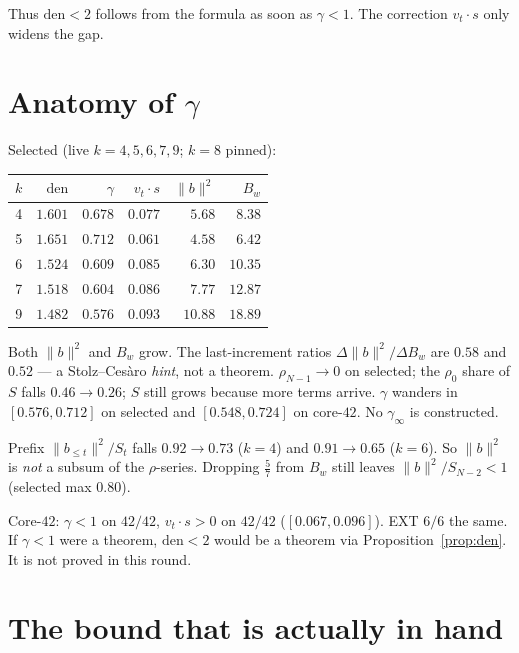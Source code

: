 \documentclass[11pt]{article}
\theoremstyle{remark}
\begin{document}
Thus $\mathrm{den}<2$ follows from the formula as
soon as $\gamma<1$.
The correction $v_t\cdot s$ only widens the gap.

\section{Anatomy of $\gamma$}\label{sec:gam}

Selected (live $k=4,5,6,7,9$; $k=8$ pinned):

\begin{center}
\begin{tabular}{rrrrrr}
\toprule
$k$ & $\mathrm{den}$ & $\gamma$ & $v_t\cdot s$ & $\|b\|^2$ & $B_w$ \\
\midrule
4 & $1.601$ & $0.678$ & $0.077$ & $5.68$ & $8.38$ \\
5 & $1.651$ & $0.712$ & $0.061$ & $4.58$ & $6.42$ \\
6 & $1.524$ & $0.609$ & $0.085$ & $6.30$ & $10.35$ \\
7 & $1.518$ & $0.604$ & $0.086$ & $7.77$ & $12.87$ \\
9 & $1.482$ & $0.576$ & $0.093$ & $10.88$ & $18.89$ \\
\bottomrule
\end{tabular}
\end{center}

Both $\|b\|^2$ and $B_w$ grow.
The last-increment ratios
$\Delta\|b\|^2/\Delta B_w$ are $0.58$ and $0.52$
--- a Stolz--Ces\`aro \emph{hint}, not a theorem.
$\rho_{N-1}\to 0$ on selected; the $\rho_0$ share of
$S$ falls $0.46\to 0.26$; $S$ still grows because
more terms arrive.
$\gamma$ wanders in $[0.576,0.712]$ on selected and
$[0.548,0.724]$ on core-$42$.
No $\gamma_\infty$ is constructed.

Prefix $\|b_{\le t}\|^2/S_t$ falls
$0.92\to 0.73$ ($k=4$) and $0.91\to 0.65$ ($k=6$).
So $\|b\|^2$ is \emph{not} a subsum of the
$\rho$-series.
Dropping $\tfrac57$ from $B_w$ still leaves
$\|b\|^2/S_{N-2}<1$ (selected max $0.80$).

Core-$42$: $\gamma<1$ on $42/42$,
$v_t\cdot s>0$ on $42/42$
($[0.067,0.096]$).
EXT $6/6$ the same.
If $\gamma<1$ were a theorem, $\mathrm{den}<2$
would be a theorem via Proposition~\ref{prop:den}.
It is not proved in this round.

\section{The bound that is actually in hand}\label{sec:bound}
\end{document}
